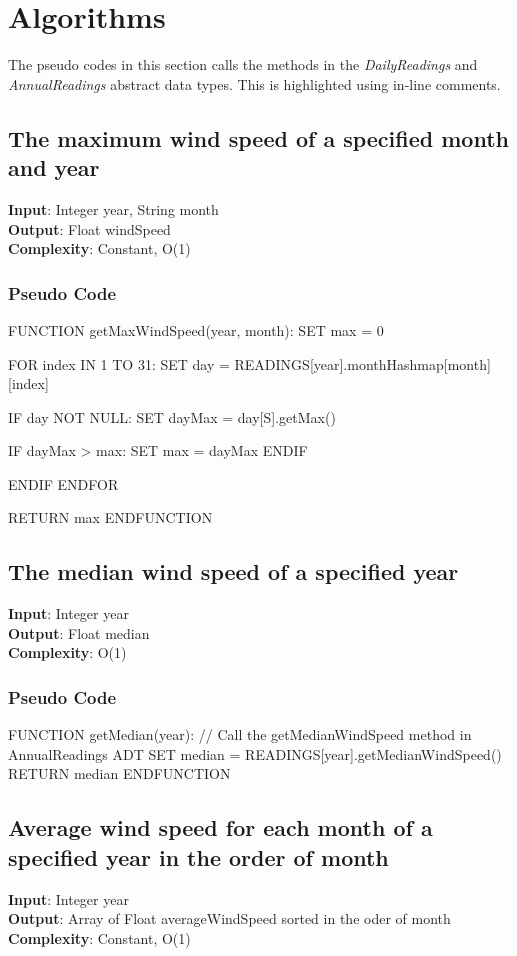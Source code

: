 \documentclass[12pt]{article}
\begin{document}
\section{Algorithms}
The pseudo codes \cite{PSEUDOCODE} in this section calls the methods in the {\em DailyReadings} and {\em AnnualReadings} abstract data types. This is highlighted using in-line comments.
\subsection{The maximum wind speed of a specified month and year}
\textbf{Input}: Integer year, String month \\  
\textbf{Output}: Float windSpeed \\
\textbf{Complexity}: Constant, O(1)
\subsubsection{Pseudo Code}
\begin{algorithm}[caption={Find maximum wind speed in a given month and year}, label=algo1]
FUNCTION getMaxWindSpeed(year, month):
	SET max = 0

	FOR index IN 1 TO 31:
		SET day = READINGS[year].monthHashmap[month][index]

		IF day NOT NULL:
			SET dayMax = day[S].getMax()

			IF dayMax > max:
				SET max = dayMax
			ENDIF

		ENDIF
	ENDFOR

	RETURN max
ENDFUNCTION
\end{algorithm}
\subsection{The median wind speed of a specified year}
\textbf{Input}: Integer year \\
\textbf{Output}: Float median \\
\textbf{Complexity}: O(1)
\subsubsection{Pseudo Code}
\begin{algorithm}[caption={Find median wind speed in a given year}, label=algo2]
FUNCTION getMedian(year):
	// Call the getMedianWindSpeed method in AnnualReadings ADT
	SET median = READINGS[year].getMedianWindSpeed()
	RETURN median
ENDFUNCTION
\end{algorithm}
\subsection{Average wind speed for each month of a specified year in the order of month}
\textbf{Input}: Integer year \\
\textbf{Output}: Array of Float averageWindSpeed sorted in the oder of month\\
\textbf{Complexity}: Constant, O(1)
\end{document}
